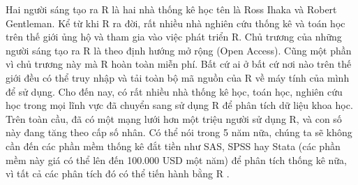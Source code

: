 \documentclass[12pt, a4paper,oneside]{book}
\theoremstyle{definition}
\begin{document}
Hai người sáng tạo ra R là hai nhà thống kê học tên là Ross Ihaka và Robert Gentleman. Kể từ khi R ra đời, rất nhiều nhà nghiên cứu thống kê và toán học trên thế giới ủng hộ và tham gia vào việc phát triển R. Chủ trương của những người sáng tạo ra R là theo định hướng mở rộng (Open Access). Cũng một phần vì chủ trương này mà R hoàn toàn miễn phí. Bất cứ ai ở bất cứ nơi nào trên thế giới đều có thể truy nhập và tải toàn bộ mã nguồn của R về máy tính của mình để sử dụng. Cho đến nay, có rất nhiều nhà thống kê học, toán học, nghiên cứu học trong mọi lĩnh vực đã chuyển sang sử dụng R để phân tích dữ liệu khoa học. Trên toàn cầu, đã có một mạng lưới hơn một triệu người sử dụng R, và con số này đang tăng theo cấp số nhân. Có thể nói trong 5 năm nữa, chúng ta sẽ không cần đến các phần mềm thống kê đắt tiền như SAS, SPSS hay Stata (các phần mềm này giá có thể lên đến 100.000 USD một năm) để phân tích thống kê nữa, vì tất cả các phân tích đó có thể tiến hành bằng R \cite{6, 7}.
\end{document}
